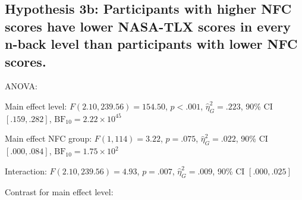 \documentclass[
  man,floatsintext]{apa6}
\begin{document}
\newpage

\hypertarget{hypothesis-3b-participants-with-higher-nfc-scores-have-lower-nasa-tlx-scores-in-every-n-back-level-than-participants-with-lower-nfc-scores.}{%
\subsection{Hypothesis 3b: Participants with higher NFC scores have lower NASA-TLX scores in every n-back level than participants with lower NFC scores.}\label{hypothesis-3b-participants-with-higher-nfc-scores-have-lower-nasa-tlx-scores-in-every-n-back-level-than-participants-with-lower-nfc-scores.}}

ANOVA:

Main effect level: \(F(2.10, 239.56) = 154.50\), \(p < .001\), \(\hat{\eta}^2_G = .223\), 90\% CI \([.159, .282]\), \(\mathrm{BF}_{\textrm{10}} = 2.22 \times 10^{45}\)

Main effect NFC group: \(F(1, 114) = 3.22\), \(p = .075\), \(\hat{\eta}^2_G = .022\), 90\% CI \([.000, .084]\), \(\mathrm{BF}_{\textrm{10}} = 1.75 \times 10^{2}\)

Interaction: \(F(2.10, 239.56) = 4.93\), \(p = .007\), \(\hat{\eta}^2_G = .009\), 90\% CI \([.000, .025]\)

Contrast for main effect level:
\end{document}
